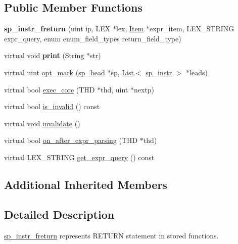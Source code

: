 \subsection*{Public Member Functions}
\begin{DoxyCompactItemize}
\item 
\mbox{\label{classsp__instr__freturn_a452e2ea55b6fb83df97c920b6207c116}} 
{\bfseries sp\+\_\+instr\+\_\+freturn} (uint ip, L\+EX $\ast$lex, \mbox{\hyperlink{classItem}{Item}} $\ast$expr\+\_\+item, L\+E\+X\+\_\+\+S\+T\+R\+I\+NG expr\+\_\+query, enum enum\+\_\+field\+\_\+types return\+\_\+field\+\_\+type)
\item 
\mbox{\label{classsp__instr__freturn_aca248f31e8ba3391d81121e5619bcf6b}} 
virtual void {\bfseries print} (String $\ast$str)
\item 
virtual uint \mbox{\hyperlink{classsp__instr__freturn_a9556622fcb532514742de4c9fdf4d506}{opt\+\_\+mark}} (\mbox{\hyperlink{classsp__head}{sp\+\_\+head}} $\ast$sp, \mbox{\hyperlink{classList}{List}}$<$ \mbox{\hyperlink{classsp__instr}{sp\+\_\+instr}} $>$ $\ast$leads)
\item 
virtual bool \mbox{\hyperlink{classsp__instr__freturn_a80fe2f90bc144b28a1a97dbff8b35e0b}{exec\+\_\+core}} (T\+HD $\ast$thd, uint $\ast$nextp)
\item 
virtual bool \mbox{\hyperlink{classsp__instr__freturn_aefb864f222cf52f923cf0ba0ce67943b}{is\+\_\+invalid}} () const
\item 
virtual void \mbox{\hyperlink{classsp__instr__freturn_a02bf622965c9cdbe481ce87a3e1051cf}{invalidate}} ()
\item 
virtual bool \mbox{\hyperlink{classsp__instr__freturn_aea65606ff061db0c9eb71b0aedecddfd}{on\+\_\+after\+\_\+expr\+\_\+parsing}} (T\+HD $\ast$thd)
\item 
virtual L\+E\+X\+\_\+\+S\+T\+R\+I\+NG \mbox{\hyperlink{classsp__instr__freturn_adccc76ff6c7a1c0f72b58eda6e542e19}{get\+\_\+expr\+\_\+query}} () const
\end{DoxyCompactItemize}
\subsection*{Additional Inherited Members}


\subsection{Detailed Description}
\mbox{\hyperlink{classsp__instr__freturn}{sp\+\_\+instr\+\_\+freturn}} represents R\+E\+T\+U\+RN statement in stored functions. 

